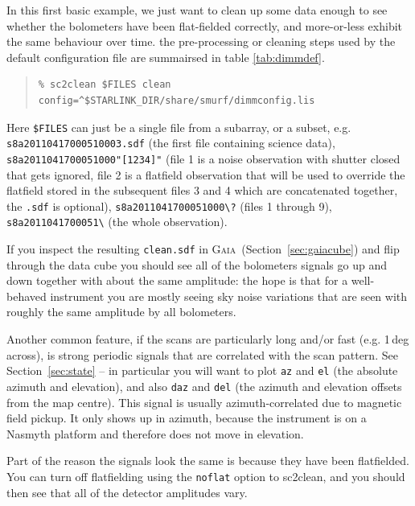 \documentclass[twoside,11pt]{article}
\newcommand{\xref}[3]{#1}
\renewcommand{\_}{\texttt{\symbol{95}}}
\newenvironment{myquote}{\begin{quote}\begin{small}}{\end{small}\end{quote}}
\newcommand{\gaia}{\xref{\textsc{Gaia}}{sun214}{}}
\newcommand{\task}[1]{\textsf{#1}}
\newcommand{\clean}{\xref{\task{sc2clean}}{sun258}{SC2CLEAN}}
\begin{document}
In this first basic example, we just want to clean up some data enough to see whether the bolometers have been flat-fielded correctly, and more-or-less exhibit the same behaviour over time. the pre-processing or cleaning steps used by the default configuration file are summairsed in table \ref{tab:dimmdef}.

\begin{myquote}
\begin{verbatim}
% sc2clean $FILES clean config=^$STARLINK_DIR/share/smurf/dimmconfig.lis
\end{verbatim}
\end{myquote}

Here \texttt{\$FILES} can just be a single file from a subarray, or a subset, e.g. \texttt{s8a20110417\_00051\_0003.sdf} (the first file containing science data), \texttt{s8a20110417\_00051\_000"[1234]"} (file 1 is a noise observation with shutter closed that gets ignored, file 2 is a flatfield observation that will be used to override the flatfield stored in the subsequent files 3 and 4 which are concatenated together, the \texttt{.sdf} is optional), \texttt{s8a20110417\_00051\_000\textbackslash?} (files 1 through 9), \texttt{s8a20110417\_00051\_\textbackslash*} (the whole observation). 

If you inspect the resulting \texttt{clean.sdf} in \gaia\ (Section~\ref{sec:gaiacube}) and flip through the data cube you should see all of the bolometers signals go up and down together with about the same amplitude: the hope is that for a well-behaved instrument you are mostly seeing sky noise variations that are seen with roughly the same amplitude by all bolometers. 

Another common feature, if the scans are particularly long and/or fast (e.g. 1\,deg across), is strong periodic signals that are correlated with the scan pattern. See Section~\ref{sec:state} -- in particular you will want to plot \texttt{az} and \texttt{el} (the absolute azimuth and elevation), and also \texttt{daz} and \texttt{del} (the azimuth and elevation offsets from the map centre). This signal is usually azimuth-correlated due to magnetic field pickup. It only shows up in azimuth, because the instrument is on a Nasmyth platform and therefore does not move in elevation.

Part of the reason the signals look the same is because they have been flatfielded. You can turn off flatfielding using the \texttt{noflat} option to \clean, and you should then see that all of the detector amplitudes vary.
\end{document}

